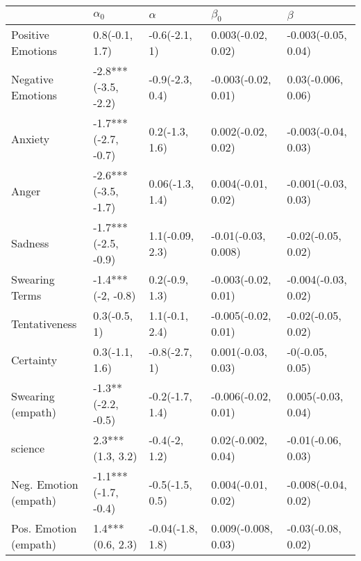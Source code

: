 \begin{tabular}{lllll}
\toprule
{} &           $\alpha_0$ &          $\alpha$ &            $\beta_0$ &              $\beta$ \\
\midrule
Positive Emotions     &       0.8(-0.1, 1.7) &     -0.6(-2.1, 1) &   0.003(-0.02, 0.02) &  -0.003(-0.05, 0.04) \\
Negative Emotions     &  -2.8***(-3.5, -2.2) &   -0.9(-2.3, 0.4) &  -0.003(-0.02, 0.01) &   0.03(-0.006, 0.06) \\
Anxiety               &  -1.7***(-2.7, -0.7) &    0.2(-1.3, 1.6) &   0.002(-0.02, 0.02) &  -0.003(-0.04, 0.03) \\
Anger                 &  -2.6***(-3.5, -1.7) &   0.06(-1.3, 1.4) &   0.004(-0.01, 0.02) &  -0.001(-0.03, 0.03) \\
Sadness               &  -1.7***(-2.5, -0.9) &   1.1(-0.09, 2.3) &  -0.01(-0.03, 0.008) &   -0.02(-0.05, 0.02) \\
Swearing Terms        &    -1.4***(-2, -0.8) &    0.2(-0.9, 1.3) &  -0.003(-0.02, 0.01) &  -0.004(-0.03, 0.02) \\
Tentativeness         &         0.3(-0.5, 1) &    1.1(-0.1, 2.4) &  -0.005(-0.02, 0.01) &   -0.02(-0.05, 0.02) \\
Certainty             &       0.3(-1.1, 1.6) &     -0.8(-2.7, 1) &   0.001(-0.03, 0.03) &      -0(-0.05, 0.05) \\
Swearing (empath)     &   -1.3**(-2.2, -0.5) &   -0.2(-1.7, 1.4) &  -0.006(-0.02, 0.01) &   0.005(-0.03, 0.04) \\
science               &     2.3***(1.3, 3.2) &     -0.4(-2, 1.2) &   0.02(-0.002, 0.04) &   -0.01(-0.06, 0.03) \\
Neg. Emotion (empath) &  -1.1***(-1.7, -0.4) &   -0.5(-1.5, 0.5) &   0.004(-0.01, 0.02) &  -0.008(-0.04, 0.02) \\
Pos. Emotion (empath) &     1.4***(0.6, 2.3) &  -0.04(-1.8, 1.8) &  0.009(-0.008, 0.03) &   -0.03(-0.08, 0.02) \\
\bottomrule
\end{tabular}
